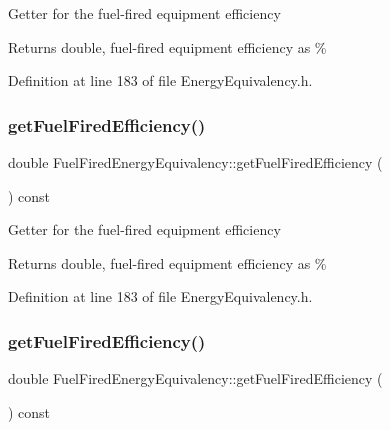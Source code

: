 Getter for the fuel-\/fired equipment efficiency

\begin{DoxyReturn}{Returns}
double, fuel-\/fired equipment efficiency as \% 
\end{DoxyReturn}


Definition at line 183 of file Energy\+Equivalency.\+h.

\mbox{\label{class_fuel_fired_energy_equivalency_ac8695c1fe3dcffeab60b5305239d2a58}} 
\subsubsection{\texorpdfstring{get\+Fuel\+Fired\+Efficiency()}{getFuelFiredEfficiency()}\hspace{0.1cm}{\footnotesize\ttfamily [2/3]}}
{\footnotesize\ttfamily double Fuel\+Fired\+Energy\+Equivalency\+::get\+Fuel\+Fired\+Efficiency (\begin{DoxyParamCaption}{ }\end{DoxyParamCaption}) const\hspace{0.3cm}{\ttfamily [inline]}}

Getter for the fuel-\/fired equipment efficiency

\begin{DoxyReturn}{Returns}
double, fuel-\/fired equipment efficiency as \% 
\end{DoxyReturn}


Definition at line 183 of file Energy\+Equivalency.\+h.

\mbox{\label{class_fuel_fired_energy_equivalency_ac8695c1fe3dcffeab60b5305239d2a58}} 
\subsubsection{\texorpdfstring{get\+Fuel\+Fired\+Efficiency()}{getFuelFiredEfficiency()}\hspace{0.1cm}{\footnotesize\ttfamily [3/3]}}
{\footnotesize\ttfamily double Fuel\+Fired\+Energy\+Equivalency\+::get\+Fuel\+Fired\+Efficiency (\begin{DoxyParamCaption}{ }\end{DoxyParamCaption}) const\hspace{0.3cm}{\ttfamily [inline]}}

